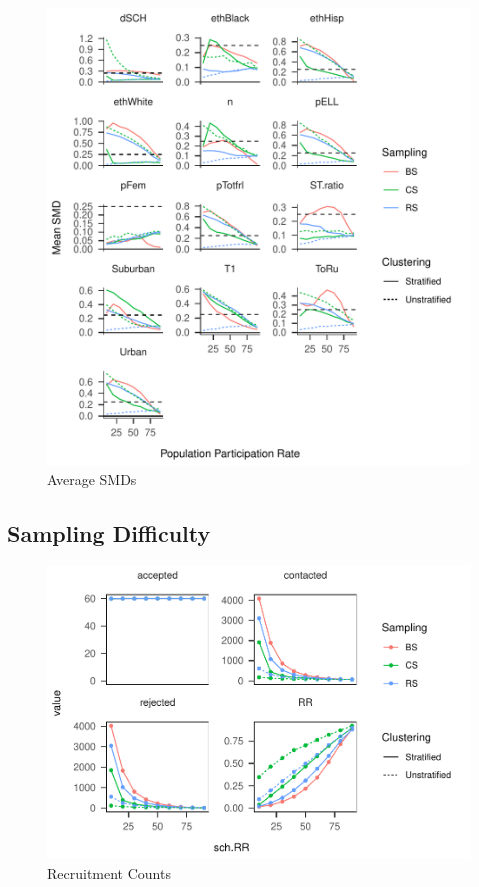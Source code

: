 \documentclass[man,floatsintext]{apa6}
\begin{document}
\begin{figure}
\centering
\includegraphics{Results_files/figure-latex/unnamed-chunk-9-1.pdf}
\caption{\label{fig:unnamed-chunk-9}Average SMDs}
\end{figure}

\hypertarget{sampling-difficulty}{%
\subsection{Sampling Difficulty}\label{sampling-difficulty}}

\begin{figure}
\centering
\includegraphics{Results_files/figure-latex/unnamed-chunk-11-1.pdf}
\caption{\label{fig:unnamed-chunk-11}Recruitment Counts}
\end{figure}
\end{document}

